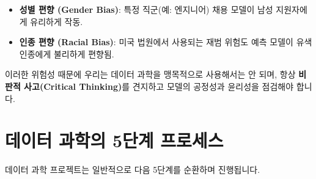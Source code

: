 \documentclass[11pt,a4paper]{book}
\theoremstyle{definition}
\begin{document}
\begin{tcolorbox}[colback=red!5, colframe=red!50!black, title={👎 데이터 과학의 위험성과 윤리}]
\begin{itemize}
    \item \textbf{성별 편향 (Gender Bias)}: 특정 직군(예: 엔지니어) 채용 모델이 남성 지원자에게 유리하게 작동.
    \item \textbf{인종 편향 (Racial Bias)}: 미국 법원에서 사용되는 재범 위험도 예측 모델이 유색인종에게 불리하게 편향됨.
\end{itemize}
\end{tcolorbox}

이러한 위험성 때문에 우리는 데이터 과학을 맹목적으로 사용해서는 안 되며, 항상 \textbf{비판적 사고(Critical Thinking)}를 견지하고 모델의 공정성과 윤리성을 점검해야 합니다.


\section{데이터 과학의 5단계 프로세스}

데이터 과학 프로젝트는 일반적으로 다음 5단계를 순환하며 진행됩니다.
\end{document}
